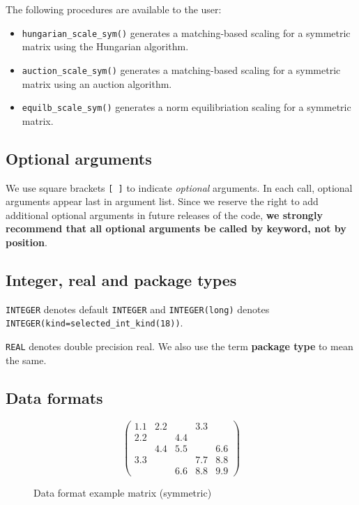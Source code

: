 \medskip

\noindent
The following procedures are available to the user:
\begin{itemize}
\item {\tt hungarian\_scale\_sym()} generates a matching-based scaling for a symmetric matrix using the Hungarian algorithm.
\item {\tt auction\_scale\_sym()} generates a matching-based scaling for a symmetric matrix using an auction algorithm.
\item {\tt equilb\_scale\_sym()} generates a norm equilibriation scaling for a symmetric matrix.
\end{itemize}

\subsection{Optional arguments}\label{Optional arguments}

We use square brackets {\tt [ ]} to indicate {\it optional} arguments.
In each
call, optional arguments appear last in argument list.  Since we
reserve the right to add additional optional arguments in future
releases of the code, {\bf we strongly recommend that all optional
arguments be called by keyword, not by position}.

\subsection{Integer, real and package types}\label{Integer kinds}

{\tt INTEGER} denotes default {\tt INTEGER} and
{\tt INTEGER(long)} denotes {\tt INTEGER(kind=selected\_int\_kind(18))}.

\noindent
{\tt REAL} denotes double precision real.
We also use the term {\bf package type} to mean the same.

\subsection{Data formats} \label{dataformats}

\begin{figure}
   \caption{ \label{format eg}
      Data format example matrix (symmetric)
   }
   $$
      \left( \begin{array}{ccccc}
         1.1 & 2.2 &     & 3.3 &     \\
         2.2 &     & 4.4 &     &     \\
             & 4.4 & 5.5 &     & 6.6 \\
         3.3 &     &     & 7.7 & 8.8 \\
             &     & 6.6 & 8.8 & 9.9
      \end{array} \right)
   $$
\end{figure}

